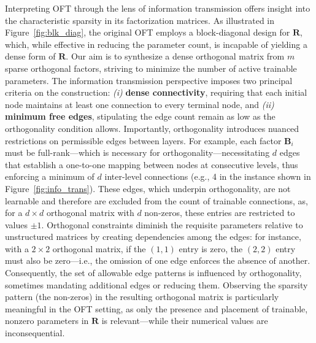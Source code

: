 Interpreting OFT through the lens of information transmission offers insight into the characteristic sparsity in its factorization matrices. As illustrated in Figure~\ref{fig:blk_diag}, the original OFT employs a block-diagonal design for $\bm{R}$, which, while effective in reducing the parameter count, is incapable of yielding a dense form of $\bm{R}$. Our aim is to synthesize a dense orthogonal matrix from $m$ sparse orthogonal factors, striving to minimize the number of active trainable parameters. The information transmission perspective imposes two principal criteria on the construction: \emph{(i)} \textbf{dense connectivity}, requiring that each initial node maintains at least one connection to every terminal node, and \emph{(ii)} \textbf{minimum free edges}, stipulating the edge count remain as low as the orthogonality condition allows. Importantly, orthogonality introduces nuanced restrictions on permissible edges between layers. For example, each factor $\bm{B}_i$ must be full-rank—which is necessary for orthogonality—necessitating $d$ edges that establish a one-to-one mapping between nodes at consecutive levels, thus enforcing a minimum of $d$ inter-level connections (e.g., 4 in the instance shown in Figure~\ref{fig:info_trans}). These edges, which underpin orthogonality, are not learnable and therefore are excluded from the count of trainable connections, as, for a $d\times d$ orthogonal matrix with $d$ non-zeros, these entries are restricted to values $\pm 1$. Orthogonal constraints diminish the requisite parameters relative to unstructured matrices by creating dependencies among the edges: for instance, with a $2\times 2$ orthogonal matrix, if the $(1,1)$ entry is zero, the $(2,2)$ entry must also be zero—i.e., the omission of one edge enforces the absence of another. Consequently, the set of allowable edge patterns is influenced by orthogonality, sometimes mandating additional edges or reducing them. Observing the sparsity pattern (the non-zeros) in the resulting orthogonal matrix is particularly meaningful in the OFT setting, as only the presence and placement of trainable, nonzero parameters in $\bm{R}$ is relevant—while their numerical values are inconsequential.

